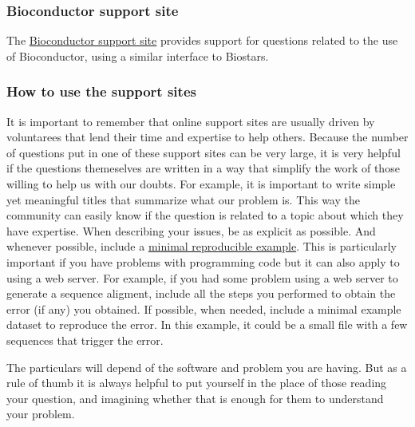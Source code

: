 \documentclass[]{book}
\theoremstyle{definition}
\theoremstyle{definition}
\theoremstyle{definition}
\theoremstyle{remark}
\begin{document}
\subsubsection*{Bioconductor support
site}\label{bioconductor-support-site}

The \href{https://support.bioconductor.org}{Bioconductor support site}
provides support for questions related to the use of Bioconductor, using
a similar interface to Biostars.

\subsubsection*{How to use the support
sites}\label{how-to-use-the-support-sites}

It is important to remember that online support sites are usually driven
by voluntarees that lend their time and expertise to help others.
Because the number of questions put in one of these support sites can be
very large, it is very helpful if the questions themeselves are written
in a way that simplify the work of those willing to help us with our
doubts. For example, it is important to write simple yet meaningful
titles that summarize what our problem is. This way the community can
easily know if the question is related to a topic about which they have
expertise. When describing your issues, be as explicit as possible. And
whenever possible, include a
\href{https://en.wikipedia.org/wiki/Minimal_Working_Example}{minimal
reproducible example}. This is particularly important if you have
problems with programming code but it can also apply to using a web
server. For example, if you had some problem using a web server to
generate a sequence aligment, include all the steps you performed to
obtain the error (if any) you obtained. If possible, when needed,
include a minimal example dataset to reproduce the error. In this
example, it could be a small file with a few sequences that trigger the
error.

The particulars will depend of the software and problem you are having.
But as a rule of thumb it is always helpful to put yourself in the place
of those reading your question, and imagining whether that is enough for
them to understand your problem.


\end{document}
